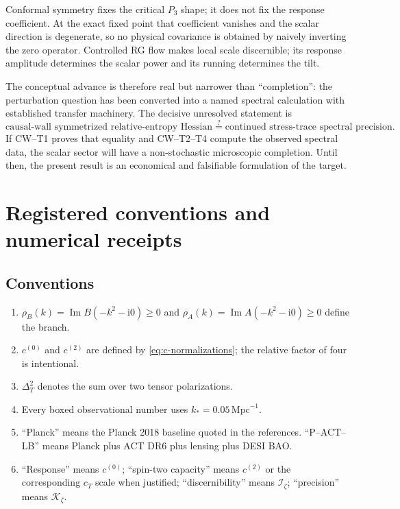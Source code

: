 \documentclass[11pt]{article}
\numberwithin{equation}{section}
\newcommand{\ii}{\mathrm i}
\newcommand{\Iz}{\mathcal I_\zeta}
\newcommand{\Kz}{\mathcal K_\zeta}
\newcommand{\cz}{c^{(0)}}
\newcommand{\ct}{c^{(2)}}
\theoremstyle{definition}
\theoremstyle{remark}
\begin{document}
Conformal symmetry fixes the critical $P_3$ shape; it does not fix the response coefficient. At the exact fixed point that coefficient vanishes and the scalar direction is degenerate, so no physical covariance is obtained by naively inverting the zero operator. Controlled RG flow makes local scale discernible; its response amplitude determines the scalar power and its running determines the tilt.

The conceptual advance is therefore real but narrower than ``completion'': the perturbation question has been converted into a named spectral calculation with established transfer machinery. The decisive unresolved statement is
\begin{equation}
\boxed{
\text{causal-wall symmetrized relative-entropy Hessian}
\stackrel{?}{=}
\text{continued stress-trace spectral precision}.}
\end{equation}
If CW--T1 proves that equality and CW--T2--T4 compute the observed spectral data, the scalar sector will have a non-stochastic microscopic completion. Until then, the present result is an economical and falsifiable formulation of the target.

\appendix
\section{Registered conventions and numerical receipts}

\subsection{Conventions}
\begin{enumerate}
\item $\rho_B(k)=\operatorname{Im}B(-k^2-\ii0)\ge0$ and $\rho_A(k)=\operatorname{Im}A(-k^2-\ii0)\ge0$ define the branch.
\item $\cz$ and $\ct$ are defined by \cref{eq:c-normalizations}; the relative factor of four is intentional.
\item $\Delta_T^2$ denotes the sum over two tensor polarizations.
\item Every boxed observational number uses $k_*=0.05\,\mathrm{Mpc}^{-1}$.
\item ``Planck'' means the Planck 2018 baseline quoted in the references. ``P--ACT--LB'' means Planck plus ACT DR6 plus lensing plus DESI BAO.
\item ``Response'' means $\cz$; ``spin-two capacity'' means $\ct$ or the corresponding $c_T$ scale when justified; ``discernibility'' means $\Iz$; ``precision'' means $\Kz$.
\end{enumerate}
\end{document}
